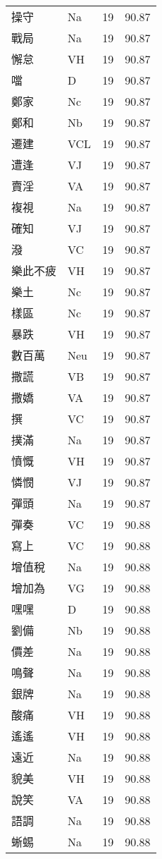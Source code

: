 \documentclass[twocolumn]{book}
\begin{document}
\begin{supertabular}{llrr}
操守 & Na & 19 &  90.87\\
戰局 & Na & 19 &  90.87\\
懈怠 & VH & 19 &  90.87\\
噹 & D & 19 &  90.87\\
鄭家 & Nc & 19 &  90.87\\
鄭和 & Nb & 19 &  90.87\\
遷建 & VCL & 19 &  90.87\\
遭逢 & VJ & 19 &  90.87\\
賣淫 & VA & 19 &  90.87\\
複視 & Na & 19 &  90.87\\
確知 & VJ & 19 &  90.87\\
潑 & VC & 19 &  90.87\\
樂此不疲 & VH & 19 &  90.87\\
樂土 & Nc & 19 &  90.87\\
樣區 & Nc & 19 &  90.87\\
暴跌 & VH & 19 &  90.87\\
數百萬 & Neu & 19 &  90.87\\
撒謊 & VB & 19 &  90.87\\
撒嬌 & VA & 19 &  90.87\\
撰 & VC & 19 &  90.87\\
撲滿 & Na & 19 &  90.87\\
憤慨 & VH & 19 &  90.87\\
憐憫 & VJ & 19 &  90.87\\
彈頭 & Na & 19 &  90.87\\
彈奏 & VC & 19 &  90.88\\
寫上 & VC & 19 &  90.88\\
增值稅 & Na & 19 &  90.88\\
增加為 & VG & 19 &  90.88\\
嘿嘿 & D & 19 &  90.88\\
劉備 & Nb & 19 &  90.88\\
價差 & Na & 19 &  90.88\\
鳴聲 & Na & 19 &  90.88\\
銀牌 & Na & 19 &  90.88\\
酸痛 & VH & 19 &  90.88\\
遙遙 & VH & 19 &  90.88\\
遠近 & Na & 19 &  90.88\\
貌美 & VH & 19 &  90.88\\
說笑 & VA & 19 &  90.88\\
語調 & Na & 19 &  90.88\\
蜥蜴 & Na & 19 &  90.88\\

\end{supertabular}
\end{document}
